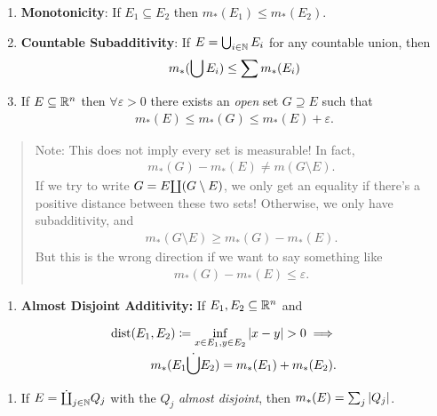 \begin{enumerate}
\def\labelenumi{\arabic{enumi}.}
\item
  \textbf{Monotonicity}: If \(E_1 \subseteq E_2\) then
  \(m_*(E_1) \leq m_*(E_2)\).
\item
  \textbf{Countable Subadditivity}: If \(E = \bigcup_{i\in{\mathbb{N}}} E_i\) for
  any countable union, then
  \begin{align*}
  m_*(\bigcup E_i) \leq \sum m_*(E_i)
  \end{align*}
\item
  If \(E \subseteq {\mathbb{R}}^n\) then \(\forall \varepsilon > 0\) there exists
  an \emph{open} set \(G \supseteq E\) such that
  \begin{align*}
  m_*(E) \leq m_*(G) \leq m_*(E) + \varepsilon.
  \end{align*}
\end{enumerate}

\begin{quote}
Note: This does not imply every set is measurable! In fact,
\begin{align*}
m_*(G) - m_*(E) \neq m(G\setminus E)
.\end{align*} If we try to write \(G = E {\coprod} (G\setminus E)\), we
only get an equality if there's a positive distance between these two
sets! Otherwise, we only have subadditivity, and
\begin{align*}
m_*(G\setminus E) \geq m_*(G) - m_*(E)
.\end{align*} But this is the wrong direction if we want to say
something like
\begin{align*}
m_*(G) - m_*(E) \leq \varepsilon
.\end{align*}
\end{quote}

\begin{enumerate}
\def\labelenumi{\arabic{enumi}.}
\setcounter{enumi}{3}
\tightlist
\item
  \textbf{Almost Disjoint Additivity:} If \(E_1, E_2 \subseteq {\mathbb{R}}^n\)
  and
\end{enumerate}

\begin{align*}
\mathrm{dist}(E_1, E_2) \coloneqq
\inf_{x\in E_1, y\in E_2} {\left\lvert {x - y} \right\rvert} > 0 
\implies \\
m_*(E_1 \dot{\bigcup} E_2) = m_*(E_1) + m_*(E_2)
.\end{align*}

\begin{enumerate}
\def\labelenumi{\arabic{enumi}.}
\setcounter{enumi}{4}
\tightlist
\item
  If \(E = \dot{{\coprod}}_{j\in {\mathbb{N}}} Q_j\) with the \(Q_j\) \emph{almost
  disjoint}, then \(m_*(E) = \sum_j {\left\lvert {Q_j} \right\rvert}\).
\end{enumerate}

